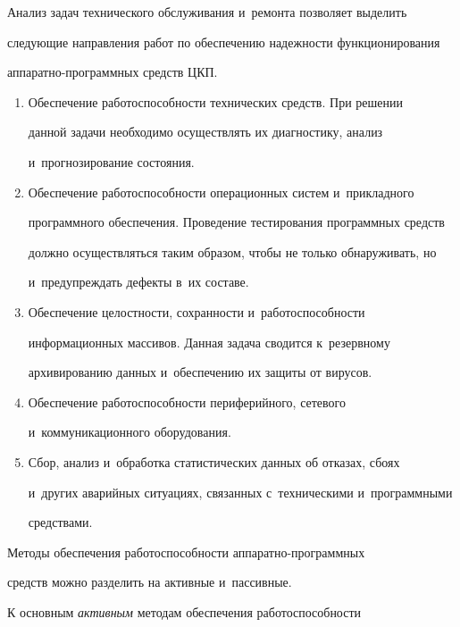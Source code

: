   

  Анализ задач технического обслуживания и~ремонта позволяет выделить 

следующие направления работ по обеспечению надежности функционирования  

ап\-па\-рат\-но-про\-грам\-мных средств ЦКП. 

  \begin{enumerate}[1.]

  \item Обеспечение работоспособности технических средств. При решении 

данной задачи необходимо осуществлять их диагностику, анализ 

и~прогнозирование состояния. 

  \item Обеспечение работоспособности операционных систем и~прикладного 

программного обеспечения. Проведение тестирования программных средств 

должно осуществляться таким образом, чтобы не только обнаруживать, но 

и~предупреждать дефекты в~их составе. 

  \item Обеспечение целостности, сохранности и~работоспособности 

информационных массивов. Данная задача сводится к~резервному 

архивированию данных и~обеспечению их защиты от вирусов. 

  \item  Обеспечение работоспособности периферийного, сетевого 

и~коммуникационного оборудования.

  \item Сбор, анализ и~обработка статистических данных об отказах, сбоях 

и~других аварийных ситуациях, связанных с~техническими и~программными 

сред\-ст\-вами.

  \end{enumerate}

  

  Методы обеспечения работоспособности ап\-па\-рат\-но-про\-грам\-мных 

средств можно разделить на активные и~пассивные.

  

  К основным \textit{активным} методам обеспечения работоспособности 

